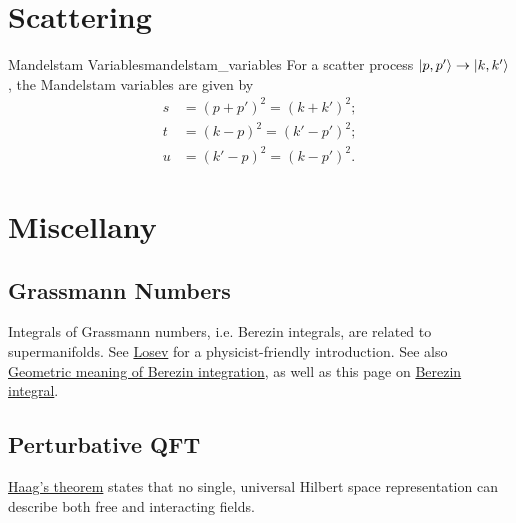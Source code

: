 \documentclass{article}
\begin{document}
\section{Scattering}

\begin{definition}{Mandelstam Variables}{mandelstam_variables}
    For a scatter process $\ket{p,p'}\rightarrow \ket{k,k'}$, the Mandelstam variables are given by
    \begin{align*}
        s &= (p+p')^2 = (k+k')^2; \\
        t &= (k-p)^2 = (k'-p')^2; \\
        u &= (k'-p)^2 = (k-p')^2.
    \end{align*}
\end{definition}

\section{Miscellany}

\subsection{Grassmann Numbers}

Integrals of Grassmann numbers, i.e. Berezin integrals, are related to supermanifolds.
See \href{ref/Losev-Berezin-Integral.pdf}{Losev} for a physicist-friendly introduction.
See also \href{https://math.stackexchange.com/questions/1449312/geometric-meaning-of-berezin-integration}{Geometric meaning of Berezin integration},
as well as this page on \href{https://ncatlab.org/nlab/show/Berezin+integral}{Berezin integral}.

\subsection{Perturbative QFT}

\href{https://en.wikipedia.org/wiki/Haag%27s_theorem}{Haag's theorem} states that no single, universal Hilbert space representation can describe both free and interacting fields.



\end{document}
